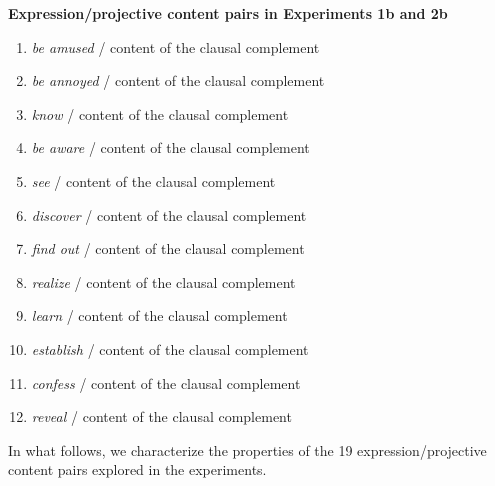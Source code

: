 \documentclass[11pt,fleqn]{article}
\newcommand{\6}{\mbox{$[\hspace*{-.6mm}[$}}
\newcommand{\9}{\mbox{$]\hspace*{-.6mm}]$}}
\begin{document}
\begin{exe}
\begin{enumerate}[itemsep=-.5mm]
\end{enumerate}


\ex\label{pairs1b2b} {\bf Expression/projective content pairs in Experiments 1b and 2b}

\begin{enumerate}[itemsep=-.5mm]

\item {\em be amused} / content of the clausal complement

\item {\em be annoyed} / content of the clausal complement

\item {\em know} / content of the clausal complement

\item {\em be aware} / content of the clausal complement

\item {\em see} / content of the clausal complement

\item {\em discover} / content of the clausal complement

\item {\em find out} / content of the clausal complement

\item {\em realize} / content of the clausal complement

\item {\em learn} / content of the clausal complement

\item {\em establish} / content of the clausal complement

\item {\em confess} / content of the clausal complement

\item {\em reveal} / content of the clausal complement

\end{enumerate}

\end{exe}

In what follows, we characterize the properties of the 19 expression/projective content pairs explored in the experiments.
\end{document}
